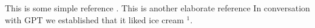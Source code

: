 \documentclass[aps,rmp,reprint,amsmath,amssymb,graphicx,longbibliography]{revtex4-1}
\begin{document}
This is some simple reference \cite{Goodfellow2016}.
This is another elaborate reference \cite{Hastie,raschka2022}
In conversation with GPT we established that it liked ice cream $^1$.

\begin{comment}
    \section{Template: Artificial Intelligence and Machine Learning for nuclear physics in broad strokes}


     Statistics, data science, and AI/ML form important fields of research
     in modern science. They describe how to learn and make predictions
     from data, and enable the extraction of key information about
     physical processes and the underlying scientific laws based on large
     datasets. As such, recent advances in AI capabilities are being
     applied to advance scientific discoveries in the physical sciences.




Ideally, AI represents the science of building models to perform a
task without being explicitly programmed. ML tasks fall under the
broader AI umbrella. We will henceforth refer to the methods discussed
as ``AI/ML''. The idea is that there exist generic algorithms which
can be used to find patterns in a broad class of datasets without
having to write code specifically for each problem. The algorithm
builds its own logic based on the data. The attentive reader should
however always keep in mind that machines and algorithms are to a
large extent developed by humans. The choice of a specific AI/ML
algorithm is governed by the insights and knowledge about a specific
system.



There exist many AI/ML approaches; they are often split into two main
categories, supervised and unsupervised. In supervised learning, data
are labeled and one lets a specific ML algorithm learn and deduce
patterns in the datasets. This allows one to make predictions about
future events and/or data not included in the training set.  On the
other hand, unsupervised learning is a method for finding patterns and
relationship in datasets without any prior knowledge of the
system. Many researchers also operate with a third category, dubbed
reinforcement learning. This is a paradigm of learning inspired by
behavioral psychology, where actions are learned to maximize reward.
One may encounter reinforcement learning being accompanied by
supervised deep learning methods. Furthermore, what is often referred
to as semi-supervised learning, entails developing algorithms that aim
at learning from a dataset that includes both labeled and unlabeled
data.



\end{comment}
\end{document}
